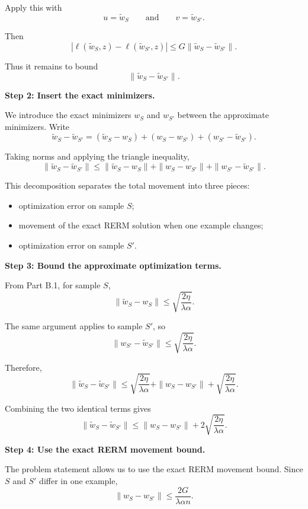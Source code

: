 \documentclass[11pt]{article}
\begin{document}
\begin{enumerate}
\begin{solutionbox}
Apply this with
\[
u=\widetilde w_S
\qquad
\text{and}
\qquad
v=\widetilde w_{S'}.
\]

Then
\[
|\ell(\widetilde w_S,z)-\ell(\widetilde w_{S'},z)|
\le
G\|\widetilde w_S-\widetilde w_{S'}\|.
\]

Thus it remains to bound
\[
\|\widetilde w_S-\widetilde w_{S'}\|.
\]

\medskip

\textbf{Step 2: Insert the exact minimizers.}

We introduce the exact minimizers $w_S$ and $w_{S'}$ between the approximate minimizers. Write
\[
\widetilde w_S-\widetilde w_{S'}
=
(\widetilde w_S-w_S)
+
(w_S-w_{S'})
+
(w_{S'}-\widetilde w_{S'}).
\]

Taking norms and applying the triangle inequality,
\[
\|\widetilde w_S-\widetilde w_{S'}\|
\le
\|\widetilde w_S-w_S\|
+
\|w_S-w_{S'}\|
+
\|w_{S'}-\widetilde w_{S'}\|.
\]

This decomposition separates the total movement into three pieces:
\begin{itemize}
    \item optimization error on sample $S$;
    \item movement of the exact RERM solution when one example changes;
    \item optimization error on sample $S'$.
\end{itemize}

\medskip

\textbf{Step 3: Bound the approximate optimization terms.}

From Part B.1, for sample $S$,
\[
\|\widetilde w_S-w_S\|
\le
\sqrt{\frac{2\eta}{\lambda\alpha}}.
\]

The same argument applies to sample $S'$, so
\[
\|w_{S'}-\widetilde w_{S'}\|
\le
\sqrt{\frac{2\eta}{\lambda\alpha}}.
\]

Therefore,
\[
\|\widetilde w_S-\widetilde w_{S'}\|
\le
\sqrt{\frac{2\eta}{\lambda\alpha}}
+
\|w_S-w_{S'}\|
+
\sqrt{\frac{2\eta}{\lambda\alpha}}.
\]

Combining the two identical terms gives
\[
\|\widetilde w_S-\widetilde w_{S'}\|
\le
\|w_S-w_{S'}\|
+
2\sqrt{\frac{2\eta}{\lambda\alpha}}.
\]

\medskip

\textbf{Step 4: Use the exact RERM movement bound.}

The problem statement allows us to use the exact RERM movement bound. Since $S$ and $S'$ differ in one example,
\[
\|w_S-w_{S'}\|
\le
\frac{2G}{\lambda\alpha n}.
\]


\end{solutionbox}
\end{enumerate}
\end{document}
